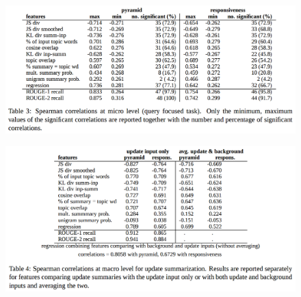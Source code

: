 \documentclass[xcolor={table}]{beamer}
\begin{document}
\begin{frame}[t]{\cite{louis2009automatically}}
      \begin{figure}[h]
          \centering
      \includegraphics[scale=.25]{images/table3-louis09.png} \\
  \end{figure}
\end{frame}


\begin{frame}[t]{\cite{louis2009automatically}}
      \begin{figure}[h]
          \centering
      \includegraphics[scale=.25]{images/table4-louis09.png} \\
  \end{figure}
\end{frame}
\end{document}
